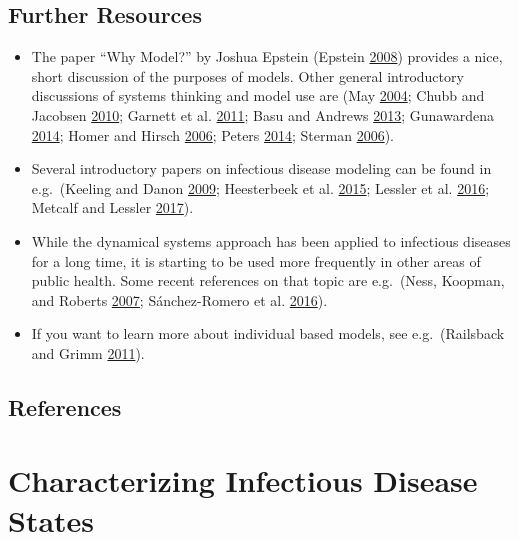 \documentclass[
]{book}
\providecommand{\tightlist}{%
  \setlength{\itemsep}{0pt}\setlength{\parskip}{0pt}}
\begin{document}
\hypertarget{further-resources}{%
\section{Further Resources}\label{further-resources}}

\begin{itemize}
\tightlist
\item
  The paper ``Why Model?'' by Joshua Epstein (Epstein \protect\hyperlink{ref-epstein08}{2008}) provides a nice, short discussion of the purposes of models. Other general introductory discussions of systems thinking and model use are (May \protect\hyperlink{ref-may04}{2004}; Chubb and Jacobsen \protect\hyperlink{ref-chubb10}{2010}; Garnett et al. \protect\hyperlink{ref-garnett11}{2011}; Basu and Andrews \protect\hyperlink{ref-basu13}{2013}; Gunawardena \protect\hyperlink{ref-gunawardena14}{2014}; Homer and Hirsch \protect\hyperlink{ref-homer06}{2006}; Peters \protect\hyperlink{ref-peters14}{2014}; Sterman \protect\hyperlink{ref-sterman06}{2006}).
\item
  Several introductory papers on infectious disease modeling can be found in e.g.~(Keeling and Danon \protect\hyperlink{ref-keeling09}{2009}; Heesterbeek et al. \protect\hyperlink{ref-heesterbeek15}{2015}; Lessler et al. \protect\hyperlink{ref-lessler16}{2016}; Metcalf and Lessler \protect\hyperlink{ref-metcalf17}{2017}).
\item
  While the dynamical systems approach has been applied to infectious diseases for a long time, it is starting to be used more frequently in other areas of public health. Some recent references on that topic are e.g.~(Ness, Koopman, and Roberts \protect\hyperlink{ref-ness07}{2007}; Sánchez-Romero et al. \protect\hyperlink{ref-sanchez-romero16}{2016}).
\item
  If you want to learn more about individual based models, see e.g.~(Railsback and Grimm \protect\hyperlink{ref-railsback11}{2011}).
\end{itemize}

\hypertarget{references-1}{%
\section{References}\label{references-1}}

\hypertarget{idstates}{%
\chapter{Characterizing Infectious Disease States}\label{idstates}}
\end{document}
